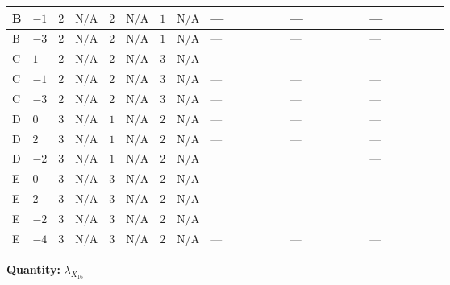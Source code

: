 \documentclass[8pt]{article}
\begin{document}
\begin{landscape}
\begin{longtable}{@{}llcccccc >{\raggedright\arraybackslash}p{0.21\linewidth} >{\raggedright\arraybackslash}p{0.21\linewidth} >{\raggedright\arraybackslash}p{0.21\linewidth}@{}}
\midrule
B & $-1$ & $2$ & $\text{N/A}$ & $2$ & $\text{N/A}$ & $1$ & $\text{N/A}$ & --- & --- & --- \\
\midrule
B & $-3$ & $2$ & $\text{N/A}$ & $2$ & $\text{N/A}$ & $1$ & $\text{N/A}$ & --- & --- & --- \\
\midrule
C & $1$ & $2$ & $\text{N/A}$ & $2$ & $\text{N/A}$ & $3$ & $\text{N/A}$ & --- & --- & --- \\
\midrule
C & $-1$ & $2$ & $\text{N/A}$ & $2$ & $\text{N/A}$ & $3$ & $\text{N/A}$ & --- & --- & --- \\
\midrule
C & $-3$ & $2$ & $\text{N/A}$ & $2$ & $\text{N/A}$ & $3$ & $\text{N/A}$ & --- & --- & --- \\
\midrule
D & $0$ & $3$ & $\text{N/A}$ & $1$ & $\text{N/A}$ & $2$ & $\text{N/A}$ & --- & --- & --- \\
\midrule
D & $2$ & $3$ & $\text{N/A}$ & $1$ & $\text{N/A}$ & $2$ & $\text{N/A}$ & --- & --- & --- \\
\midrule
D & $-2$ & $3$ & $\text{N/A}$ & $1$ & $\text{N/A}$ & $2$ & $\text{N/A}$ & \scriptsize\adjustbox{max width=\linewidth}{$\begin{gathered} +{\lambda_{HS_2}^{(1)}} (6 {\lambda_{X_{2}}}+8 {\lambda_{X_{16}}})\end{gathered}$} & \scriptsize\adjustbox{max width=\linewidth}{$\begin{gathered} +2 {\lambda_{S_2}^{(1)}} {\lambda_{X_{16}}}\end{gathered}$} & --- \\
\midrule
E & $0$ & $3$ & $\text{N/A}$ & $3$ & $\text{N/A}$ & $2$ & $\text{N/A}$ & --- & --- & --- \\
\midrule
E & $2$ & $3$ & $\text{N/A}$ & $3$ & $\text{N/A}$ & $2$ & $\text{N/A}$ & --- & --- & --- \\
\midrule
E & $-2$ & $3$ & $\text{N/A}$ & $3$ & $\text{N/A}$ & $2$ & $\text{N/A}$ & \scriptsize\adjustbox{max width=\linewidth}{$\begin{gathered} +{\lambda_{HS_2}^{(1)}} (10 {\lambda_{X_{2}}}+8 {\lambda_{X_{16}}})\end{gathered}$} & \scriptsize\adjustbox{max width=\linewidth}{$\begin{gathered} +2 {\lambda_{S_2}^{(1)}} {\lambda_{X_{16}}}\end{gathered}$} & \scriptsize\adjustbox{max width=\linewidth}{$\begin{gathered} -4 {\lambda_{S_2}^{(A)}} {\lambda_{X_{16}}}\end{gathered}$} \\
\midrule
E & $-4$ & $3$ & $\text{N/A}$ & $3$ & $\text{N/A}$ & $2$ & $\text{N/A}$ & --- & --- & --- \\
\midrule
\bottomrule
\end{longtable}
\clearpage
\noindent\textbf{Quantity: }${\lambda_{X_{16}}}$\par\smallskip

\end{landscape}
\end{document}
